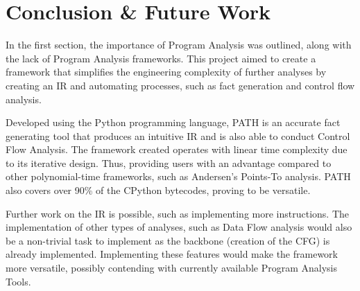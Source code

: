 \chapter{Conclusion \& Future Work}
\par In the first section, the importance of Program Analysis was outlined, along with the lack of Program Analysis frameworks. This project aimed to create a framework that simplifies the engineering complexity of 
further analyses by creating an \acs{IR} and automating processes, such as fact generation and control flow analysis.
\par Developed using the Python programming language, \acs{PATH} is an accurate fact generating tool that produces an intuitive \acs{IR} and is also able to conduct Control Flow Analysis. The framework created operates with linear time complexity due to its iterative design.
Thus, providing users with an advantage compared to other polynomial-time frameworks, such as Andersen's Points-To analysis. \acs{PATH} also covers over 90\% of the CPython bytecodes, proving to be versatile.
\par Further work on the \acs{IR} is possible, such as implementing more instructions. The implementation of other types of analyses, such as Data Flow analysis would also be a non-trivial task to implement as the backbone (creation of the \acs{CFG}) is already implemented.
Implementing these features would make the framework more versatile, possibly contending with currently available Program Analysis Tools.
